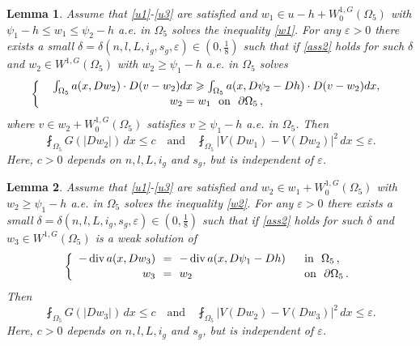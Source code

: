 \documentclass[10pt,a4paper]{amsart}
\newtheorem{lemma}{Lemma}
\begin{document}
\begin{lemma}\label{w1w2l}
	Assume that \eqref{u1}-\eqref{u3} are satisfied and   $w_1 \in u-h+ W_0^{1,G}(\Omega_5)$ with $\psi_1-h\leqslant w_1\leqslant \psi_2-h $ a.e. in $\Omega_5$ solves the inequality \eqref{w1}.  
	For any $\varepsilon > 0$ there exists a small $\delta=\delta(n,l,L,i_g,s_g,\varepsilon) \in (0,\frac{1}{8})$ such that if \eqref{ass2} holds for such $\delta$ and  $w_2 \in W^{1,G}(\Omega_5)$ with $ w_2 \geqslant \psi_1-h$ a.e. in $\Omega_5$ solves
	\begin{equation}\label{w2}
		\left\{\begin{array}{r@{\ \ }c@{\ \ }ll}
			&\int_{\Omega_5}  a(x,  Dw_2) \cdot D(v-w_2)dx \geqslant \int_{\Omega_5}  a(x,  D\psi_2-Dh) \cdot D(v-w_2)dx,  \\[0.05cm]
			&w_2=w_1 \ \ \mbox{on}\ \ \partial \Omega_5 \,,
		\end{array}\right.
	\end{equation}
	where $v\in w_2+W_0^{1,G}(\Omega_5)$ satisfies $ v \geqslant \psi_1-h$ a.e. in $\Omega_5$.
	Then
	\begin{equation}\label{w1w2}
		\fint_{\Omega_5} G(|Dw_2|)\,dx \leq c \quad \text{and} \quad \fint_{\Omega_5} |V(Dw_1)-V(Dw_2)|^2\,dx \leq \varepsilon.  
	\end{equation}
	Here, $c > 0$ depends on $n,l,L,i_g$ and $s_g$, but is independent of $\varepsilon$.
	\end{lemma}

		\begin{lemma}\label{w2w3l}
		Assume that \eqref{u1}-\eqref{u3} are satisfied and   $w_2 \in w_1+ W_0^{1,G}(\Omega_5)$ with $ w_2 \geqslant \psi_1-h$ a.e. in $\Omega_5$ solves  the inequality \eqref{w2}.  
		For any $\varepsilon > 0$ there exists a small $\delta=\delta(n,l,L,i_g,s_g,\varepsilon) \in (0,\frac{1}{8})$ such that if \eqref{ass2} holds for such $\delta$ and  $w_3 \in W^{1,G}(\Omega_5)$ is a weak solution of 
		\begin{equation}\label{w3}
			\left\{\begin{array}{r@{\ \ }c@{\ \ }ll}
					-\operatorname{div}a(x,Dw_3) &=&-\operatorname{div}a(x,D\psi_1-Dh) \ \ &\mbox{in}\ \   \Omega_5 \,,  \\[0.05cm]
				 w_3 &=&w_2 \ \ &\mbox{on}\ \ \partial \Omega_5 \,.
			\end{array}\right.
		\end{equation}
		Then
		\begin{equation}\label{w2w3}
			\fint_{\Omega_5} G(|Dw_3|)\,dx \leq c \quad \text{and} \quad \fint_{\Omega_5} |V(Dw_2)-V(Dw_3)|^2\,dx \leq \varepsilon.  
		\end{equation}
		Here, $c > 0$ depends on $n,l,L,i_g$ and $s_g$, but is independent of $\varepsilon$.
	\end{lemma}
\end{document}
